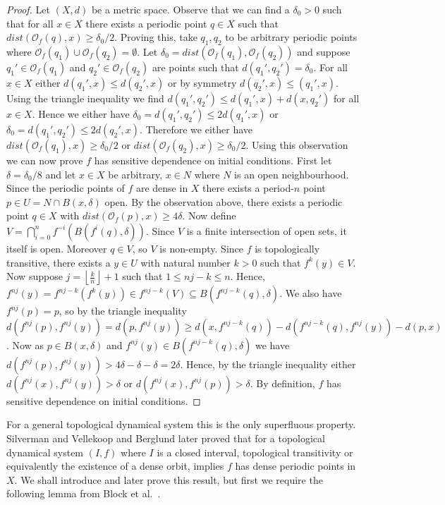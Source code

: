 \begin{prop}
\begin{proof}
        Let $(X, d)$ be a metric space. Observe that we can find a $\delta_0 > 0$ such that for all $x \in X$ there exists a periodic point $q \in X$ such that $dist(\mathcal{O}_f(q), x) \geq \delta_0/2$. Proving this, take $q_1, q_2$ to be arbitrary periodic points where $\mathcal{O}_f(q_1) \cup \mathcal{O}_f(q_2) = \emptyset$. Let $\delta_0 = dist(\mathcal{O}_f(q_1), \mathcal{O}_f(q_2))$ and suppose $q_1' \in \mathcal{O}_f(q_1)$ and  $q_2' \in \mathcal{O}_f(q_2)$ are points such that $d(q_1', q_2') = \delta_0$. For all $x \in X$ either $d(q_1', x) \leq d(q_2', x)$ or by symmetry $d(q_2', x) \leq (q_1', x)$. Using the triangle inequality we find $d(q_1', q_2') \leq d(q_1', x) + d(x, q_2')$ for all $x \in X$. Hence we either have $\delta_0 = d(q_1', q_2') \leq 2d(q_1', x)$ or $\delta_0 = d(q_1', q_2') \leq 2d(q_2', x)$. Therefore we either have $dist(\mathcal{O}_f(q_1), x) \geq \delta_0/2$ or $dist(\mathcal{O}_f(q_2), x) \geq \delta_0/2$. Using this observation we can now prove $f$ has sensitive dependence on initial conditions. First let $\delta = \delta_0/8$ and let $x \in X$ be arbitrary, $x \in N$ where $N$ is an open neighbourhood. Since the periodic points of $f$ are dense in $X$ there exists a period-$n$ point $p \in U = N \cap B(x, \delta)$ open. By the observation above, there exists a periodic point $q \in X$ with $dist(\mathcal{O}_f(p), x) \geq 4\delta$. Now define $V = \bigcap_{i=0}^n f^{-i}(B(f^i(q), \delta))$. Since $V$ is a finite intersection of open sets, it itself is open. Moreover $q \in V$, so $V$ is non-empty. Since $f$ is topologically transitive, there exists a $y \in U$ with natural number $k > 0$ such that $f^k(y) \in V$. Now suppose $j = \left\lfloor \frac{k}{n} \right\rfloor + 1$ such that $1 \leq nj - k \leq n$. Hence, $f^{nj}(y) = f^{nj - k}(f^k(y)) \in f^{nj - k}(V) \subseteq B(f^{nj - k}(q), \delta)$. We also have $f^{nj}(p) = p$, so by the triangle inequality $d(f^{nj}(p), f^{nj}(y)) = d(p, f^{nj}(y)) \geq d(x, f^{nj - k}(q)) - d(f^{nj - k}(q), f^{nj}(y)) - d(p, x)$. Now as $p \in B(x, \delta)$ and $f^{nj}(y) \in B(f^{nj - k}(q), \delta)$ we have $d(f^{nj}(p), f^{nj}(y)) > 4\delta - \delta - \delta = 2\delta$. Hence, by the triangle inequality either $d(f^{nj}(x), f^{nj}(y)) > \delta$ or $d(f^{nj}(x), f^{nj}(p)) > \delta$. By definition, $f$ has sensitive dependence on initial conditions.
    \end{proof}
\end{prop}

For a general topological dynamical system this is the only superfluous property. Silverman \cite{silverman} and Vellekoop and Berglund \cite{vellekoop-berglund} later proved that for a topological dynamical system $(I, f)$ where $I$ is a closed interval, topological transitivity or equivalently the existence of a dense orbit, implies $f$ has dense periodic points in $X$. We shall introduce and later prove this result, but first we require the following lemma from Block et al.\ \cite[\S 4.1]{block-coppel}.

